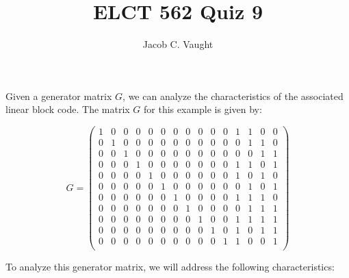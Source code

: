 \documentclass[12pt]{article}
\title{ELCT 562 Quiz 9}
\author{Jacob C. Vaught}
\date{}
\begin{document}
\maketitle

Given a generator matrix \(G\), we can analyze the characteristics of the associated linear block code. The matrix \(G\) for this example is given by:

\[
G = \left(\begin{array}{ccccccccccccccc}
1 & 0 & 0 & 0 & 0 & 0 & 0 & 0 & 0 & 0 & 0 & 1 & 1 & 0 & 0 \\
0 & 1 & 0 & 0 & 0 & 0 & 0 & 0 & 0 & 0 & 0 & 0 & 1 & 1 & 0 \\
0 & 0 & 1 & 0 & 0 & 0 & 0 & 0 & 0 & 0 & 0 & 0 & 0 & 1 & 1 \\
0 & 0 & 0 & 1 & 0 & 0 & 0 & 0 & 0 & 0 & 0 & 1 & 1 & 0 & 1 \\
0 & 0 & 0 & 0 & 1 & 0 & 0 & 0 & 0 & 0 & 0 & 1 & 0 & 1 & 0 \\
0 & 0 & 0 & 0 & 0 & 1 & 0 & 0 & 0 & 0 & 0 & 0 & 1 & 0 & 1 \\
0 & 0 & 0 & 0 & 0 & 0 & 1 & 0 & 0 & 0 & 0 & 1 & 1 & 1 & 0 \\
0 & 0 & 0 & 0 & 0 & 0 & 0 & 1 & 0 & 0 & 0 & 0 & 1 & 1 & 1 \\
0 & 0 & 0 & 0 & 0 & 0 & 0 & 0 & 1 & 0 & 0 & 1 & 1 & 1 & 1 \\
0 & 0 & 0 & 0 & 0 & 0 & 0 & 0 & 0 & 1 & 0 & 1 & 0 & 1 & 1 \\
0 & 0 & 0 & 0 & 0 & 0 & 0 & 0 & 0 & 0 & 1 & 1 & 0 & 0 & 1 \\
\end{array}\right)
\]

To analyze this generator matrix, we will address the following characteristics:
\end{document}
